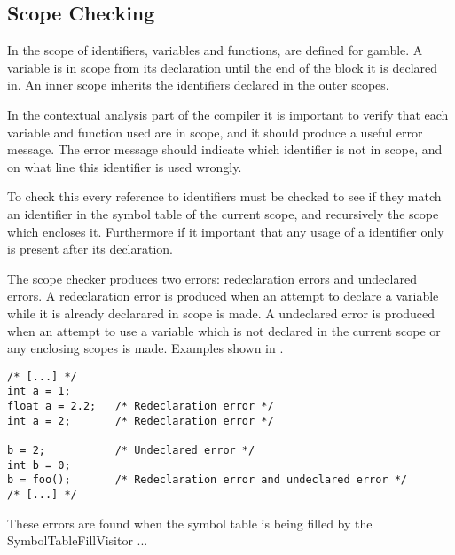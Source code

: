 \subsection*{Scope Checking}
In  the scope of identifiers, variables and functions, are defined for \gls{gamble}.
A variable is in scope from its declaration until the end of the block it is declared in.
An inner scope inherits the identifiers declared in the outer scopes. 

In the contextual analysis part of the compiler it is important to verify that each variable and function used are in scope, and it should produce a useful error message.
The error message should indicate which identifier is not in scope, and on what line this identifier is used wrongly.

To check this every reference to identifiers must be checked to see if they match an identifier in the symbol table of the current scope, and recursively the scope which encloses it. 
Furthermore if it important that any usage of a identifier only is present after its declaration.

The scope checker produces two errors: redeclaration errors and undeclared errors.
A redeclaration error is produced when an attempt to declare a variable while it is already declarared in scope is made.
A undeclared error is produced when an attempt to use a variable which is not declared in the current scope or any enclosing scopes is made. 
Examples shown in .

\begin{lstlisting}[caption=Examples of scope errors in \gls{gamble}, numbers=none,frame=tlrb,label={lst:scopeErrors}]
/* [...] */
int a = 1;
float a = 2.2;   /* Redeclaration error */
int a = 2;       /* Redeclaration error */ 

b = 2;           /* Undeclared error */   
int b = 0;
b = foo();       /* Redeclaration error and undeclared error */ 
/* [...] */
\end{lstlisting}
                         
These errors are found when the symbol table is being filled by the SymbolTableFillVisitor ... 